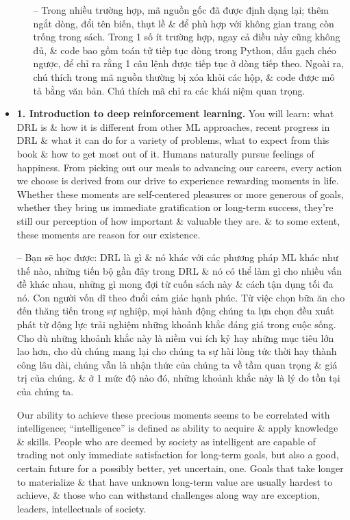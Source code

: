 \documentclass{article}
\begin{document}
\begin{itemize}
\begin{itemize}
        -- Trong nhiều trường hợp, mã nguồn gốc đã được định dạng lại; thêm ngắt dòng, đổi tên biến, thụt lề \& để phù hợp với không gian trang còn trống trong sách. Trong 1 số ít trường hợp, ngay cả điều này cũng không đủ, \& code bao gồm toán tử tiếp tục dòng trong Python, dấu gạch chéo ngược, để chỉ ra rằng 1 câu lệnh được tiếp tục ở dòng tiếp theo. Ngoài ra, chú thích trong mã nguồn thường bị xóa khỏi các hộp, \& code được mô tả bằng văn bản. Chú thích mã chỉ ra các khái niệm quan trọng.
    \end{itemize}
    \item {\bf1. Introduction to deep reinforcement learning.} You will learn: what DRL is \& how it is different from other ML approaches, recent progress in DRL \& what it can do for a variety of problems, what to expect from this book \& how to get most out of it. Humans naturally pursue feelings of happiness. From picking out our meals to advancing our careers, every action we choose is derived from our drive to experience rewarding moments in life. Whether these moments are self-centered pleasures or more generous of goals, whether they bring us immediate gratification or long-term success, they're still our perception of how important \& valuable they are. \& to some extent, these moments are reason for our existence.

    -- Bạn sẽ học được: DRL là gì \& nó khác với các phương pháp ML khác như thế nào, những tiến bộ gần đây trong DRL \& nó có thể làm gì cho nhiều vấn đề khác nhau, những gì mong đợi từ cuốn sách này \& cách tận dụng tối đa nó. Con người vốn dĩ theo đuổi cảm giác hạnh phúc. Từ việc chọn bữa ăn cho đến thăng tiến trong sự nghiệp, mọi hành động chúng ta lựa chọn đều xuất phát từ động lực trải nghiệm những khoảnh khắc đáng giá trong cuộc sống. Cho dù những khoảnh khắc này là niềm vui ích kỷ hay những mục tiêu lớn lao hơn, cho dù chúng mang lại cho chúng ta sự hài lòng tức thời hay thành công lâu dài, chúng vẫn là nhận thức của chúng ta về tầm quan trọng \& giá trị của chúng. \& ở 1 mức độ nào đó, những khoảnh khắc này là lý do tồn tại của chúng ta.

    Our ability to achieve these precious moments seems to be correlated with intelligence; ``intelligence'' is defined as ability to acquire \& apply knowledge \& skills. People who are deemed by society as intelligent are capable of trading not only immediate satisfaction for long-term goals, but also a good, certain future for a possibly better, yet uncertain, one. Goals that take longer to materialize \& that have unknown long-term value are usually hardest to achieve, \& those who can withstand challenges along way are exception, leaders, intellectuals of society.


\end{itemize}
\end{document}
